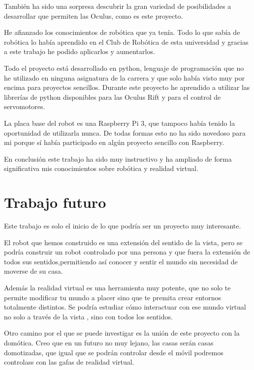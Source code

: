 \documentclass[twoside, 12pt]{epstfg}
\begin{document}
También ha sido una sorpresa descubrir la gran variedad de posibilidades a desarrollar que permiten las Oculus, como es este proyecto.

He afianzado los conocimientos de robótica que ya tenía. Todo lo que sabía de robótica lo había aprendido en el Club de Robótica de esta universidad y gracias a este trabajo he podido aplicarlos y aumentarlos.

Todo el proyecto está desarrollado en python, lenguaje de programación que no he utilizado en ninguna asignatura de la carrera y que solo había visto muy por encima para proyectos sencillos.
Durante este proyecto he aprendido a utilizar las librerías de python disponibles para las Oculus Rift y para el control de servomotores.

La placa base del robot es una Raspberry Pi 3, que tampoco había tenido la oportunidad de utilizarla nunca. De todas formas esto no ha sido novedoso para mi porque sí había participado en algún proyecto sencillo con Raspberry.

En conclusión este trabajo ha sido muy instructivo y ha ampliado de forma significativa mis conocimientos sobre robótica y realidad virtual.



\section{Trabajo futuro}
Este trabajo es solo el inicio de lo que podría ser un proyecto muy interesante.

El robot que hemos construido es una extensión del sentido de la vista, pero se podría construir un robot controlado por una persona y que fuera la extensión de todos sus sentidos,permitiendo así conocer y sentir el mundo sin necesidad de moverse de su casa.

Además la realidad virtual es una herramienta muy potente, que no solo te permite modificar tu mundo a placer sino que te premita crear entornos totalmente distintos. Se podría estudiar cómo interactuar con ese mundo virtual no solo a través de la vista , sino con todos los sentidos.

Otro camino por el que se puede investigar es la unión de este proyecto con la domótica.
Creo que en un futuro no muy lejano, las casas serán casas domotizadas, que igual que se podrán controlar desde el móvil podremos controlass con las gafas de realidad virtual.

\backmatter
\appendix

\cleardoublepage

\nocite{*}
{}

\cleardoublepage
\printindex
\end{document}

